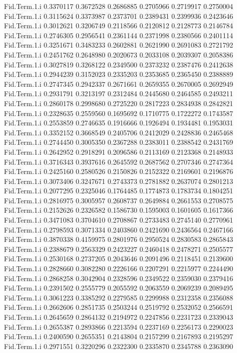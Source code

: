 \documentclass[11pt]{article} %
\begin{document}
\begin{Schunk}
\begin{Soutput}
Fid.Term.1.i 0.3370117 0.3672528 0.2686885 0.2705966 0.2719917 0.2750004
Fid.Term.1.i 0.3115624 0.3373987 0.2373701 0.2389431 0.2399936 0.2423646
Fid.Term.1.i 0.3012621 0.3206749 0.2118566 0.2120812 0.2128773 0.2146784
Fid.Term.1.i 0.2746305 0.2956541 0.2361144 0.2371998 0.2380566 0.2401114
Fid.Term.1.i 0.3251671 0.3483233 0.2602881 0.2621990 0.2691083 0.2721792
Fid.Term.1.i 0.2451762 0.2648980 0.2020673 0.2033108 0.2039307 0.2058386
Fid.Term.1.i 0.3027819 0.3268122 0.2349500 0.2373232 0.2387476 0.2412638
Fid.Term.1.i 0.2944239 0.3152023 0.2335203 0.2353685 0.2365450 0.2388889
Fid.Term.1.i 0.2747345 0.2942337 0.2671661 0.2659355 0.2670005 0.2692949
Fid.Term.1.i 0.2931791 0.3213197 0.2312484 0.2445680 0.2464585 0.2493211
Fid.Term.1.i 0.2860178 0.2998680 0.2725220 0.2817223 0.2834938 0.2842821
Fid.Term.1.i 0.2328635 0.2559560 0.1695692 0.1710775 0.1722272 0.1743587
Fid.Term.1.i 0.2553859 0.2746635 0.1916666 0.1926494 0.1934481 0.1953031
Fid.Term.1.i 0.3352152 0.3668549 0.2405706 0.2412029 0.2428836 0.2465468
Fid.Term.1.i 0.2744450 0.3005350 0.2367288 0.2383011 0.2388542 0.2431769
Fid.Term.1.i 0.2642952 0.2918291 0.2096586 0.2113169 0.2123368 0.2148933
Fid.Term.1.i 0.3716343 0.3937616 0.2645592 0.2687562 0.2707346 0.2747364
Fid.Term.1.i 0.2425160 0.2580526 0.2150826 0.2152322 0.2169601 0.2196876
Fid.Term.1.i 0.3073406 0.3247671 0.2743373 0.2781882 0.2637074 0.2801213
Fid.Term.1.i 0.2077295 0.2325046 0.1764485 0.1774873 0.1783734 0.1804251
Fid.Term.1.i 0.2816975 0.3005957 0.2608737 0.2649884 0.2661553 0.2708575
Fid.Term.1.i 0.2152626 0.2326582 0.1586730 0.1595003 0.1601605 0.1617366
Fid.Term.1.i 0.3471083 0.3704610 0.2708867 0.2733483 0.2745140 0.2770961
Fid.Term.1.i 0.2798593 0.3071334 0.2403860 0.2421690 0.2436564 0.2467166
Fid.Term.1.i 0.3870338 0.4159975 0.2801976 0.2950524 0.2830583 0.2865843
Fid.Term.1.i 0.2388679 0.2563329 0.2423227 0.2460418 0.2478271 0.2505577
Fid.Term.1.i 0.2530168 0.2737205 0.2043646 0.2091496 0.2118451 0.2139600
Fid.Term.1.i 0.2828660 0.3082280 0.2226166 0.2207291 0.2215977 0.2244490
Fid.Term.1.i 0.2868258 0.3042904 0.2328596 0.2349522 0.2359030 0.2379416
Fid.Term.1.i 0.2391502 0.2555779 0.2055592 0.2063559 0.2069239 0.2089495
Fid.Term.1.i 0.3061223 0.3385292 0.2279585 0.2299988 0.2312358 0.2356088
Fid.Term.1.i 0.2662606 0.2851735 0.2503244 0.2519792 0.2532052 0.2566591
Fid.Term.1.i 0.2645659 0.2864132 0.2194972 0.2247856 0.2231723 0.2339043
Fid.Term.1.i 0.2655387 0.2893866 0.2213594 0.2237169 0.2256173 0.2290023
Fid.Term.1.i 0.2400590 0.2655351 0.2143804 0.2157299 0.2167893 0.2195297
Fid.Term.1.i 0.2971551 0.3220296 0.2322300 0.2335870 0.2345788 0.2363090

\end{Soutput}
\end{Schunk}
\end{document}
